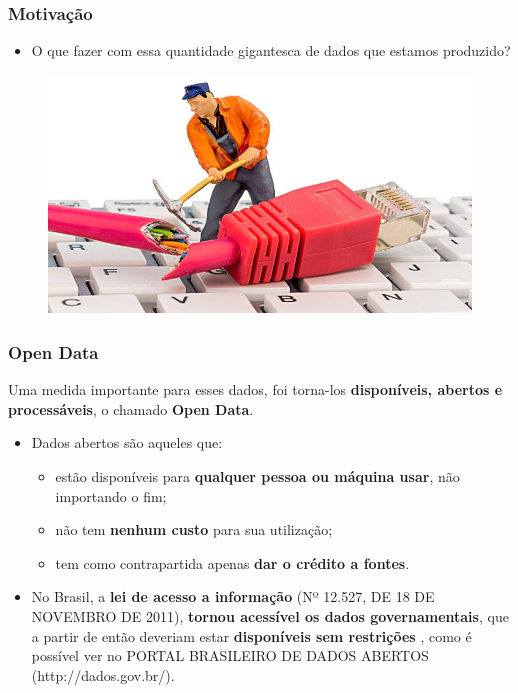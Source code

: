 \documentclass[hyperref={pdfpagelabels=false}]{beamer}
\begin{document}
\begin{frame}
	\frametitle{Motivação}
		\begin{itemize}
        \item O que fazer com essa quantidade gigantesca de dados que estamos produzido? 
	\end{itemize}		
    
    \begin{figure}[h]
	\centering
		\includegraphics[scale=0.3]{img/internetNao}
	\label{fig:internetNao}
\end{figure}	
    
    
\end{frame}


\begin{frame}
	\frametitle{Open Data}
		
   Uma medida importante para esses dados, foi torna-los \textbf{disponíveis, abertos e processáveis}, o chamado \textbf{Open Data}.
        \begin{itemize}
        \item Dados abertos são aqueles que:
        	\begin{itemize}
        	\item  estão disponíveis para \textbf{qualquer pessoa ou máquina usar}, não importando o fim;
            \item não tem \textbf{nenhum custo} para sua utilização; 
            \item tem como contrapartida apenas \textbf{dar o crédito a fontes}.
			\end{itemize}
        \item No Brasil, a \textbf{lei de acesso a informação} (Nº 12.527, DE 18 DE NOVEMBRO DE 2011), \textbf{tornou acessível os  dados governamentais}, que a partir de então deveriam estar \textbf{disponíveis sem restrições} \cite{Vaz2011}, como é possível ver no PORTAL BRASILEIRO DE DADOS ABERTOS (http://dados.gov.br/).
	\end{itemize}		
\end{frame}
\end{document}

